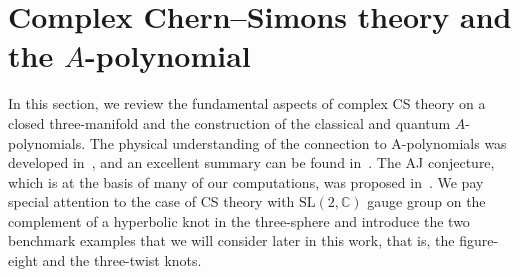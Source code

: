 \documentclass[a4paper,11pt]{article}
\theoremstyle{definition}
\def\IC{{\mathbb C}}
\begin{document}
\section{Complex Chern--Simons theory and the $A$-polynomial} \label{sec: theory}
In this section, we review the fundamental aspects of complex CS theory on a closed three-manifold and the construction of the classical and quantum $A$-polynomials. 
The physical understanding of the connection to A-polynomials was 
developed in~\cite{gukov}, and an excellent summary can be found in~\cite{dimofte-rev}. 
The AJ conjecture, which is at the basis of many of our computations, was proposed in~\cite{stavros-aj}. 
We pay special attention to the case of CS theory with $\text{SL}(2,\IC)$ gauge group on the complement of a hyperbolic knot in the three-sphere and introduce the two benchmark examples that we will consider later in this work, that is, the figure-eight and the three-twist knots.
\end{document}

